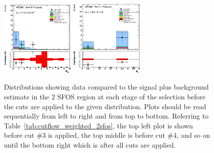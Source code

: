 \begin{figure}[ht!]
\includegraphics[width=0.32\textwidth]{figures/appendix_signal_selection/Nov24Update_FakeSys_KFacSys_LinearY_Rebin/output/jobs/MxM/DataFull_Rates_May13_FakeRatesExactly2Loose_MuonMxMBJetGt0_ElBJetGt0SubtractPC_MxM/PreselectionNov23_15_2SFOS_ChargeAbs1_BVeto85_ZVeto20GeV_METGt55GeV_DeltaPhi2p5_physics/weight_all/eps/NJets_histratio.eps}
\includegraphics[width=0.32\textwidth]{figures/appendix_signal_selection/Nov24Update_FakeSys_KFacSys_LinearY_Rebin/output/jobs/MxM/DataFull_Rates_May13_FakeRatesExactly2Loose_MuonMxMBJetGt0_ElBJetGt0SubtractPC_MxM/PreselectionNov23_15_2SFOS_ChargeAbs1_BVeto85_ZVeto20GeV_METGt55GeV_DeltaPhi2p5_NJetLt2_physics/weight_all/eps/NMuons_histratio.eps}



\caption{Distributions showing data compared to the signal plus background estimate in the 2 SFOS region at each stage 
of the selection before the cuts are applied to the given distribution. Plots should be read sequentially from left to right
and from top to bottom. 
Referring to Table~\ref{tab:cutflow_weighted_2sfos}, the top left
plot is shown before cut \#3 is applied, the top middle is before cut \#4, and
so on until the bottom right which is after all cuts are applied.}
\label{fig:2sfos}
\end{figure}

